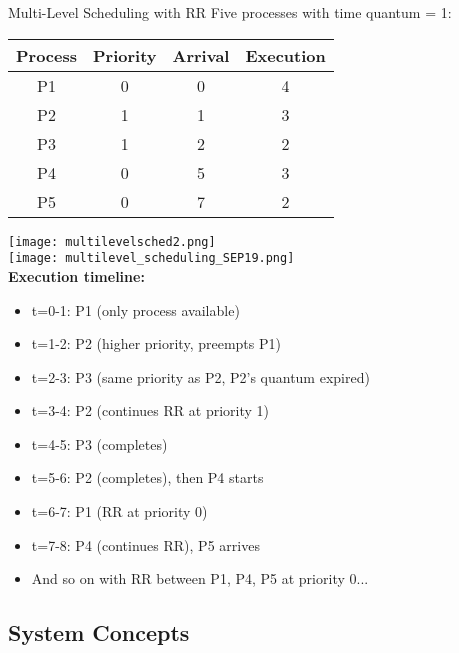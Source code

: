 \begin{example2}{Multi-Level Scheduling with RR}
    Five processes with time quantum = 1:
    
    \begin{tabular}{|c|c|c|c|}
        \hline
        Process & Priority & Arrival & Execution \\
        \hline
        P1 & 0 & 0 & 4 \\
        P2 & 1 & 1 & 3 \\
        P3 & 1 & 2 & 2 \\
        P4 & 0 & 5 & 3 \\
        P5 & 0 & 7 & 2 \\
        \hline
    \end{tabular}
    
    \tcblower

    \texttt{[image: multilevelsched2.png]}
    \vspace{2mm}\\
    \texttt{[image: multilevel\_scheduling\_SEP19.png]}
    \vspace{2mm}\\
    \textbf{Execution timeline:}
    \begin{itemize}
        \item t=0-1: P1 (only process available)
        \item t=1-2: P2 (higher priority, preempts P1)
        \item t=2-3: P3 (same priority as P2, P2's quantum expired)
        \item t=3-4: P2 (continues RR at priority 1)
        \item t=4-5: P3 (completes)
        \item t=5-6: P2 (completes), then P4 starts
        \item t=6-7: P1 (RR at priority 0)
        \item t=7-8: P4 (continues RR), P5 arrives
        \item And so on with RR between P1, P4, P5 at priority 0...
    \end{itemize}
\end{example2}

\subsection{System Concepts}

